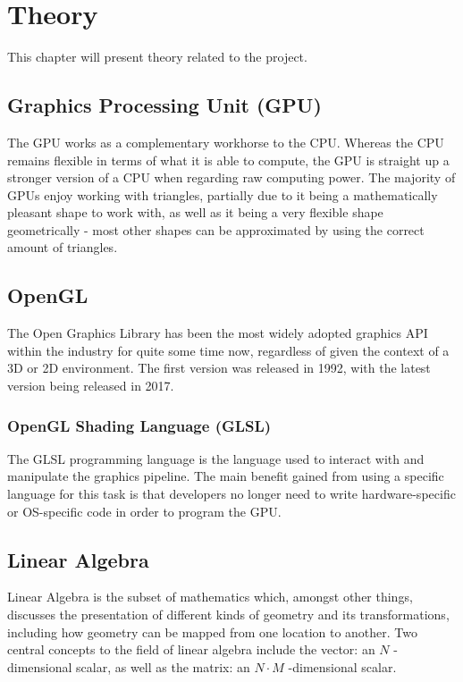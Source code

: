 \section{Theory}
\label{ch:theory}
\noindent
This chapter will present theory related to the project.

\subsection{Graphics Processing Unit (GPU)}

The GPU works as a complementary workhorse to the CPU. Whereas the CPU remains flexible in terms of what it is able to compute, the GPU is straight up a stronger version of a CPU when regarding raw computing power. The majority of GPUs enjoy working with triangles, partially due to it being a mathematically pleasant shape to work with, as well as it being a very flexible shape geometrically - most other shapes can be approximated by using the correct amount of triangles.\cite{gpu}

\subsection{OpenGL}

The Open Graphics Library has been the most widely adopted graphics API within the industry for quite some time now, regardless of given the context of a 3D or 2D environment. The first version was released in 1992, with the latest version being released in 2017.\cite{opengl}

\subsubsection{OpenGL Shading Language (GLSL)}

The GLSL programming language is the language used to interact with and manipulate the graphics pipeline. The main benefit gained from using a specific language for this task is that developers no longer need to write hardware-specific or OS-specific code in order to program the GPU.\cite{glsl}

\subsection{Linear Algebra}

Linear Algebra is the subset of mathematics which, amongst other things, discusses the presentation of different kinds of geometry and its transformations, including how geometry can be mapped from one location to another. Two central concepts to the field of linear algebra include the vector: an $N$ -dimensional scalar, as well as the matrix: an $N\cdot M$ -dimensional scalar.

